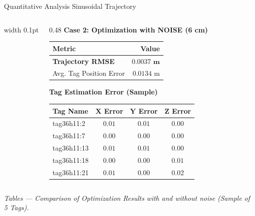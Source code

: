 \begin{frame}{Quantitative Analysis Sinusoidal Trajectory }
\begin{columns}[T]
        \vrule width 0.1pt

        \begin{column}{0.48\textwidth}
            \centering
            \textbf{Case 2: Optimization with NOISE (6 cm)} 
            \vspace{0.1cm}
            
            \begin{tabular}{lr}
                \toprule
                \textbf{Metric} & \textbf{Value} \\
                \midrule
                \textbf{Trajectory RMSE} & $\mathbf{0.0037 \text{ m}}$ \\ 
                Avg. Tag Position Error & $0.0134 \text{ m}$ \\
                \bottomrule
            \end{tabular}

            \vspace{0.3cm}
            
            \textbf{Tag Estimation Error (Sample)}
            \begin{tabular}{lccc}
                \toprule
                \textbf{Tag Name} & $\mathbf{X}$ \textbf{Error} & $\mathbf{Y}$ \textbf{Error} & $\mathbf{Z}$ \textbf{Error} \\
                \midrule
                tag36h11:2 & $0.01$ & $0.01$ & $0.00$ \\
                tag36h11:7 & $0.00$ & $0.00$ & $0.00$ \\
                tag36h11:13 & $0.01$ & $0.01$ & $0.00$ \\
                tag36h11:18 & $0.00$ & $0.00$ & $0.01$ \\
                tag36h11:21 & $0.01$ & $0.00$ & $0.02$ \\
                \bottomrule
            \end{tabular}
            
        \end{column}

    \end{columns}
    
    \begin{center}
        \textit{Tables — Comparison of Optimization Results with and without noise (Sample of 5 Tags).}
    \end{center}
\end{frame}

